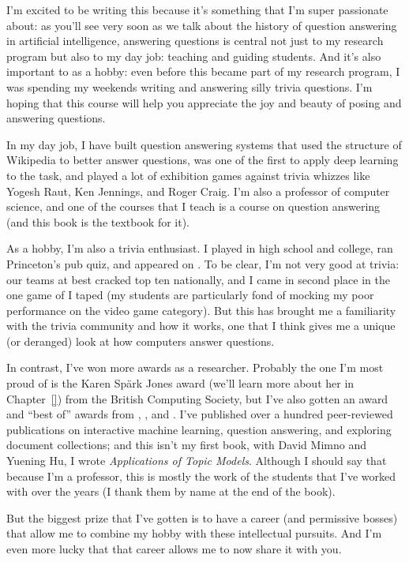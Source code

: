 I’m excited to be writing this because it’s something that I’m super
passionate about: as you’ll see very soon as we talk about the history of
question answering in artificial intelligence, answering questions is central
not just to my research program but also to my day job: teaching and guiding
students.  And it’s also important to as a hobby: even before this became part
of my research program, I was spending my weekends writing and answering silly
trivia questions.  I’m hoping that this course will help you appreciate the
joy and beauty of posing and answering questions.

In my day job, I have built question answering systems that used the structure
of Wikipedia to better answer questions, was one of the first to apply deep
learning to the  task, and played a lot of exhibition games against
trivia whizzes like Yogesh Raut, Ken Jennings, and Roger Craig.  I'm also a
professor of computer science, and one of the courses that I teach is a
course on question answering (and this book is the textbook for it).

As a hobby, I'm also a trivia enthusiast.  I played \qb{} in high school and
college, ran Princeton's pub quiz, and appeared on \jeopardy{}.
%
To be clear, I'm not very good at trivia: our \qb{} teams at best cracked top
ten nationally, and I came in second place in the one game of \jeopardy{} I
taped (my students are particularly fond of mocking my poor performance on the
video game category).
%
But this has brought me a familiarity with the trivia community and how it
works, one that I think gives me a unique (or deranged) look at how computers
answer questions.

In contrast, I've won more awards as a researcher.
%
Probably the one I'm most proud of is the Karen Sp\"ark Jones award (we'll
learn more about her in Chapter~\ref{}) from the British Computing Society,
but I've also gotten an  award and ``best of'' awards from
, , and .
%
I've published over a hundred peer-reviewed publications on interactive
machine learning, question answering, and exploring document collections; and
this isn't my first book, with David Mimno and Yuening Hu, I wrote
\emph{Applications of Topic Models}.
%
Although I should say that because I'm a professor, this is mostly the work of
the students that I've worked with over the years (I thank them by name at the
end of the book).

But the biggest prize that I've gotten is to have a career (and permissive
bosses) that allow me to combine my hobby with these intellectual pursuits.
%
And I'm even more lucky that that career allows me to now share it with you.

